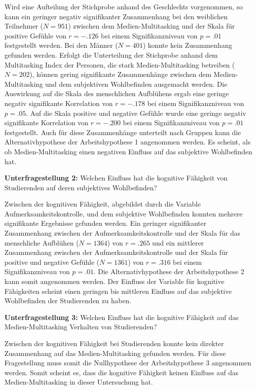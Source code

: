 Wird eine Aufteilung der Stichprobe anhand des Geschlechts vorgenommen, so kann ein geringer negativ signifikanter Zusammenhang bei den weiblichen Teilnehmer ($N=951$) zwischen dem Medien-Multitasking und der Skala für positive Gefühle von $r=-.126$ bei einem Signifikanzniveau von $p=.01$ festgestellt werden. Bei den Männer ($N=401$) konnte kein Zusammenhang gefunden werden. Erfolgt die Unterteilung der Stichprobe anhand dem Multitasking Index der Personen, die stark Medien-Multitasking betreiben ($N=202$), können gering signifikante Zusammenhänge zwischen dem Medien-Multitasking und dem subjektiven Wohlbefinden ausgemacht werden. Die Auswirkung auf die Skala des  menschlichen Aufblühens ergab eine geringe negativ signifikante Korrelation von $r=-.178$ bei einem Signifikanzniveau von $p=.05$. Auf die Skala positive und negative Gefühle wurde eine geringe negativ signifikante Korrelation von $r=-.200$ bei einem Signifikanzniveau von $p=.01$ festgestellt. Auch für diese Zusammenhänge unterteilt nach Gruppen kann die Alternativhypothese der Arbeitshypothese 1 angenommen werden. Es scheint, als ob Medien-Multitasking einen negativen Einfluss auf das subjektive Wohlbefinden hat.
\par
\textbf{Unterfragestellung 2:} Welchen Einfluss hat die kognitive Fähigkeit von Studierenden auf deren subjektives Wohlbefinden?
\par
Zwischen der kognitiven Fähigkeit, abgebildet durch die Variable Aufmerksamkeitskontrolle, und dem subjektive Wohlbefinden konnten mehrere signifikante Ergebnisse gefunden werden. Ein geringer signifikanter Zusammenhang zwischen der Aufmerksamkeitskontrolle und der Skala für das menschliche Aufblühen ($N=1364$) von $r=.265$ und ein mittlerer Zusammenhang zwischen der Aufmerksamkeitskontrolle und der Skala für positive und negative Gefühle ($N=1361$) von $r=.316$ bei einem Signifikanzniveau von $p=.01$. Die Alternativhypothese der Arbeitshypothese 2 kann somit angenommen werden. Der Einfluss der Variable für kognitive Fähigkeiten scheint einen geringen bis mittleren Einfluss auf das subjektive Wohlbefinden der Studierenden zu haben.
\par
\textbf{Unterfragestellung 3:} Welchen Einfluss hat die kognitive Fähigkeit auf das Medien-Multitasking Verhalten von Studierenden?
\par
Zwischen der kognitiven Fähigkeit bei Studierenden konnte kein direkter Zusammenhang auf das Medien-Multitasking gefunden werden. Für diese Fragestellung muss somit die Nullhypothese der Arbeitshypothese 3 angenommen werden. Somit scheint es, dass die kognitive Fähigkeit keinen Einfluss auf das Medien-Multitasking in dieser Untersuchung hat. \\
